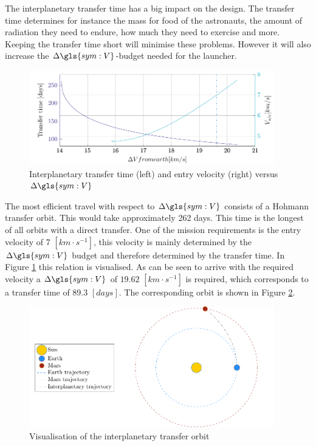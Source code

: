 The interplanetary transfer time has a big impact on the design. The transfer time determines for instance the mass for food of the astronauts, the amount of radiation they need to endure, how much they need to exercise and more. Keeping the transfer time short will minimise these problems. However it will also increase the $\Delta\gls{sym:V}$-budget needed for the launcher. 

\begin{figure}[h]
	\centering
	\includegraphics[width=0.95\textwidth]{Figure/Inter_transfer/transfer_time.pdf}
	\caption[Interplanetary transfer time and entry velocity versus $\Delta\gls{sym:V}$]{Interplanetary transfer time (left) and entry velocity (right) versus $\Delta\gls{sym:V}$}
	\label{fig:inter_time}
\end{figure}

The most efficient travel with respect to $\Delta\gls{sym:V}$ consists of a Hohmann transfer orbit. This would take approximately 262 days. This time is the longest of all orbits with a direct transfer. One of the mission requirements is the entry velocity of 7 $\left[km \cdot s^{-1}\right]$, this velocity is mainly determined by the $\Delta \gls{sym:V}$ budget and therefore determined by the transfer time. In Figure \ref{fig:inter_time} this relation is visualised. As can be seen to arrive with the required velocity a $\Delta \gls{sym:V}$ of $19.62$ $\left[km \cdot s^{-1}\right]$ is required, which corresponds to a transfer time of 89.3 $\left[days\right]$. The corresponding orbit is shown in Figure \ref{fig:inter_orbit}.

\begin{figure}[h]
	\centering
	\includegraphics[width=0.95\textwidth]{Figure/Inter_transfer/orbits.pdf}
	\caption{Visualisation of the interplanetary transfer orbit}
	\label{fig:inter_orbit}
\end{figure}
